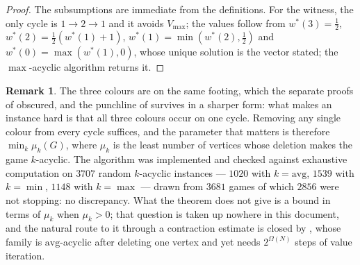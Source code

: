 \documentclass[11pt]{article}
\theoremstyle{plain}
\theoremstyle{definition}
\newtheorem{remark}[theorem]{Remark}
\newcommand{\Vmax}{V_{\max}}
\begin{document}
\begin{proof}
The subsumptions are immediate from the definitions. For the witness, the
only cycle is $1\to2\to1$ and it avoids $\Vmax$; the values follow from
$w^\ast(3)=\tfrac12$, $w^\ast(2)=\tfrac12(w^\ast(1)+1)$,
$w^\ast(1)=\min(w^\ast(2),\tfrac12)$ and
$w^\ast(0)=\max(w^\ast(1),0)$, whose unique solution is the vector stated;
the $\max$-acyclic algorithm returns it.
\end{proof}

\begin{remark}\label{rem:kacyclic}
The three colours are on the same footing, which the separate proofs of
 obscured, and the
punchline of  survives in a sharper form: what makes
an instance hard is that all three colours occur on one cycle. Removing
any single colour from every cycle suffices, and the parameter that
matters is therefore $\min_k\mu_k(G)$, where $\mu_k$ is the least number
of vertices whose deletion makes the game $k$-acyclic. The algorithm was
implemented and checked against exhaustive computation on $3707$ random
$k$-acyclic instances --- $1020$ with $k=\mathrm{avg}$, $1539$ with
$k=\min$, $1148$ with $k=\max$ --- drawn from $3681$ games of which $2856$
were not stopping: no discrepancy. What the theorem does not give is a
bound in terms of $\mu_k$ when $\mu_k>0$; that question is taken up
nowhere in this document, and the natural route to it through a
contraction estimate is closed by , whose family is
$\mathrm{avg}$-acyclic after deleting one vertex and yet needs
$2^{\Omega(N)}$ steps of value iteration.
\end{remark}
\end{document}
